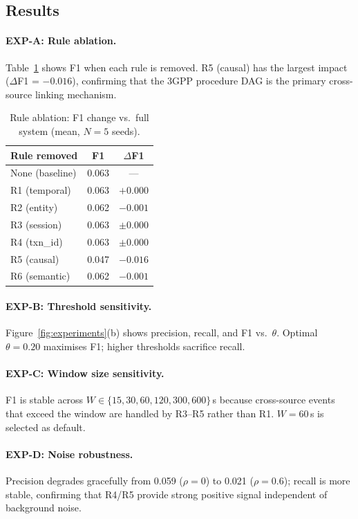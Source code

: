 \subsection{Results}

\paragraph{EXP-A: Rule ablation.}
Table~\ref{tab:ablation} shows F1 when each rule is removed.
R5 (causal) has the largest impact ($\Delta$F1 = $-0.016$), confirming
that the 3GPP procedure DAG is the primary cross-source linking mechanism.

\begin{table}[t]
\centering
\caption{Rule ablation: F1 change vs.\ full system (mean, $N=5$ seeds).}
\label{tab:ablation}
\begin{tabular}{lcc}
\toprule
\textbf{Rule removed} & \textbf{F1} & \boldmath$\Delta$\textbf{F1} \\
\midrule
None (baseline) & 0.063 & --- \\
R1 (temporal)   & 0.063 & $+0.000$ \\
R2 (entity)     & 0.062 & $-0.001$ \\
R3 (session)    & 0.063 & $\pm0.000$ \\
R4 (txn\_id)    & 0.063 & $\pm0.000$ \\
R5 (causal)     & 0.047 & $-0.016$ \\
R6 (semantic)   & 0.062 & $-0.001$ \\
\bottomrule
\end{tabular}
\end{table}

\paragraph{EXP-B: Threshold sensitivity.}
Figure~\ref{fig:experiments}(b) shows precision, recall, and F1 vs.\ $\theta$.
Optimal $\theta = 0.20$ maximises F1; higher thresholds sacrifice recall.

\paragraph{EXP-C: Window size sensitivity.}
F1 is stable across $W \in \{15, 30, 60, 120, 300, 600\}$\,s because
cross-source events that exceed the window are handled by R3–R5 rather
than R1. $W = 60$\,s is selected as default.

\paragraph{EXP-D: Noise robustness.}
Precision degrades gracefully from 0.059 ($\rho=0$) to 0.021 ($\rho=0.6$);
recall is more stable, confirming that R4/R5 provide strong positive signal
independent of background noise.

